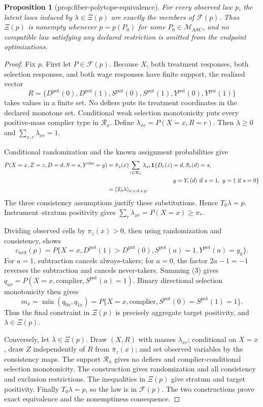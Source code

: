\documentclass{article}
\newtheorem{proposition}{Proposition}
\begin{document}
\begin{proposition}[prop:fiber-polytope-equivalence]\label{prop:fiber-polytope-equivalence}
For every observed law \(p\), the latent laws induced by \(\lambda\in\Xi(p)\) are exactly the members of \(\mathcal F(p)\). Thus \(\Xi(p)\) is nonempty whenever \(p=p(P_0)\) for some \(P_0\in\mathcal M_{\mathrm{ASC}}\), and no compatible law satisfying any declared restriction is omitted from the endpoint optimizations.
\end{proposition}
\begin{proof}
Fix \(p\). First let \(P\in\mathcal F(p)\). Because \(X\), both treatment responses, both selection responses, and both wage responses have finite support, the realized vector
\[
 R=\{D^{\mathrm{pot}}(0),D^{\mathrm{pot}}(1),S^{\mathrm{pot}}(0),S^{\mathrm{pot}}(1),Y^{\mathrm{pot}}(0),Y^{\mathrm{pot}}(1)\}
\]
takes values in a finite set. No defiers puts its treatment coordinates in the declared monotone set. Conditional weak selection monotonicity puts every positive-mass complier type in \(\mathcal R_x\). Define \(\lambda_{xr}=P(X=x,R=r)\). Then \(\lambda\ge0\) and \(\sum_{x,r}\lambda_{xr}=1\).

Conditional randomization and the known assignment probabilities give
\[
 \begin{split}
 P(X=x,Z=z,D=d,S=s,Y^{\mathrm{obs}}=y)
 &=\bar\pi_z(x)\sum_{r\in\mathcal R_x}\lambda_{xr}
 \mathbf 1\{D_r(z)=d,S_r(d)=s,\\
 &\hspace{40mm}y=Y_r(d)\text{ if }s=1,\ 
 y=\dagger\text{ if }s=0\}\\
 &=(T_0\lambda)_{x,z,d,s,y}.
 \end{split}
\]
The three consistency assumptions justify these substitutions. Hence \(T_0\lambda=p\). Instrument--stratum positivity gives \(\sum_r\lambda_{xr}=P(X=x)\ge\pi_*\).

Dividing observed cells by \(\pi_z(x)>0\), then using randomization and consistency, shows
\[
 c_{axk}(p)=P\{X=x,D^{\mathrm{pot}}(1)>D^{\mathrm{pot}}(0),
 S^{\mathrm{pot}}(a)=1,Y^{\mathrm{pot}}(a)=y_k\}. \tag{3}
\]
For \(a=1\), subtraction cancels always-takers; for \(a=0\), the factor \(2a-1=-1\) reverses the subtraction and cancels never-takers. Summing (3) gives \(q_{ax}=P(X=x,\text{complier},S^{\mathrm{pot}}(a)=1)\). Binary directional selection monotonicity then gives
\[
 m_x=\min(q_{0x},q_{1x})
 =P\{X=x,\text{complier},S^{\mathrm{pot}}(0)=S^{\mathrm{pot}}(1)=1\}.
\]
Thus the final constraint in \(\Xi(p)\) is precisely aggregate target positivity, and \(\lambda\in\Xi(p)\).

Conversely, let \(\lambda\in\Xi(p)\). Draw \((X,R)\) with masses \(\lambda_{xr}\); conditional on \(X=x\), draw \(Z\) independently of \(R\) from \(\bar\pi_z(x)\); and set observed variables by the consistency maps. The support \(\mathcal R_x\) gives no defiers and complier-conditional selection monotonicity. The construction gives randomization and all consistency and exclusion restrictions. The inequalities in \(\Xi(p)\) give stratum and target positivity. Finally \(T_0\lambda=p\), so the law is in \(\mathcal F(p)\). The two constructions prove exact equivalence and the nonemptiness consequence.
\end{proof}
\end{document}
